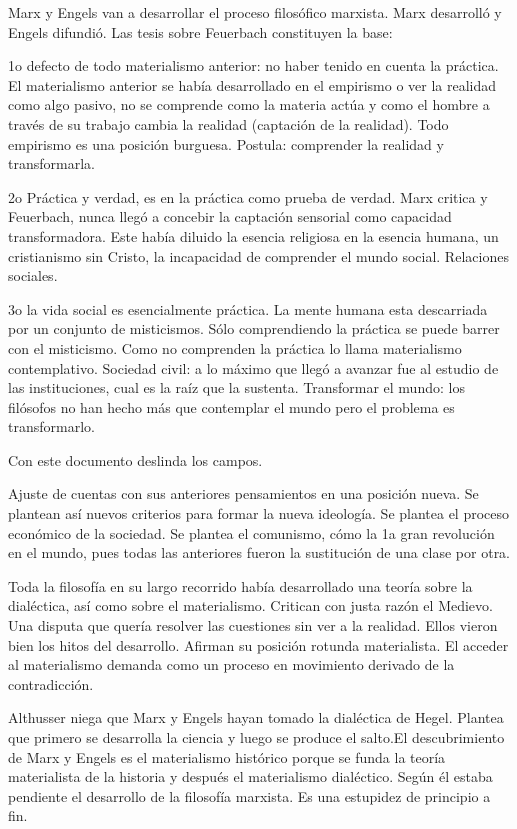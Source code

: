 \documentclass[
  a4paper,
]{article}
\begin{document}
Marx y Engels van a desarrollar el proceso filosófico marxista. Marx
desarrolló y Engels difundió. Las tesis sobre Feuerbach constituyen la
base:

1o defecto de todo materialismo anterior: no haber tenido en cuenta la
práctica. El materialismo anterior se había desarrollado en el empirismo
o ver la realidad como algo pasivo, no se comprende como la materia
actúa y como el hombre a través de su trabajo cambia la realidad
(captación de la realidad). Todo empirismo es una posición burguesa.
Postula: comprender la realidad y transformarla.

2o Práctica y verdad, es en la práctica como prueba de verdad. Marx
critica y Feuerbach, nunca llegó a concebir la captación sensorial como
capacidad transformadora. Este había diluido la esencia religiosa en la
esencia humana, un cristianismo sin Cristo, la incapacidad de comprender
el mundo social. Relaciones sociales.

3o la vida social es esencialmente práctica. La mente humana esta
descarriada por un conjunto de misticismos. Sólo comprendiendo la
práctica se puede barrer con el misticismo. Como no comprenden la
práctica lo llama materialismo contemplativo. Sociedad civil: a lo
máximo que llegó a avanzar fue al estudio de las instituciones, cual es
la raíz que la sustenta. Transformar el mundo: los filósofos no han
hecho más que contemplar el mundo pero el problema es transformarlo.

Con este documento deslinda los campos.

Ajuste de cuentas con sus anteriores pensamientos en una posición nueva.
Se plantean así nuevos criterios para formar la nueva ideología. Se
plantea el proceso económico de la sociedad. Se plantea el comunismo,
cómo la 1a gran revolución en el mundo, pues todas las anteriores fueron
la sustitución de una clase por otra.

Toda la filosofía en su largo recorrido había desarrollado una teoría
sobre la dialéctica, así como sobre el materialismo. Critican con justa
razón el Medievo. Una disputa que quería resolver las cuestiones sin ver
a la realidad. Ellos vieron bien los hitos del desarrollo. Afirman su
posición rotunda materialista. El acceder al materialismo demanda como
un proceso en movimiento derivado de la contradicción.

Althusser niega que Marx y Engels hayan tomado la dialéctica de Hegel.
Plantea que primero se desarrolla la ciencia y luego se produce el
salto.El descubrimiento de Marx y Engels es el materialismo histórico
porque se funda la teoría materialista de la historia y después el
materialismo dialéctico. Según él estaba pendiente el desarrollo de la
filosofía marxista. Es una estupidez de principio a fin.
\end{document}
